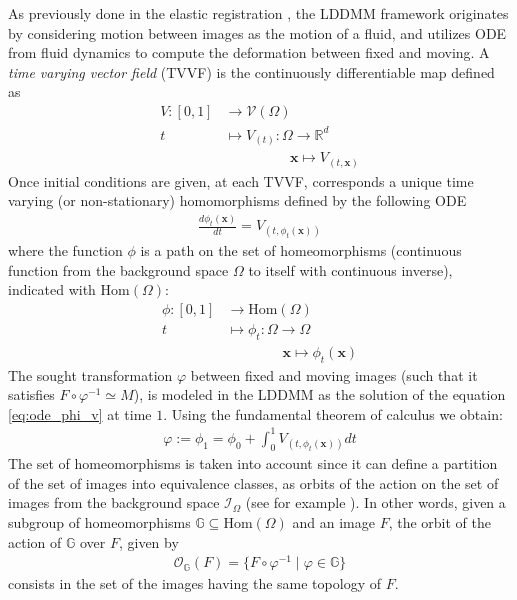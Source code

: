 As previously done in the elastic registration \cite{Broit:1981}, the LDDMM framework \cite{beg2005computing} originates by considering motion between images as the motion of a fluid, and utilizes ODE from fluid dynamics to compute the deformation between fixed and moving. 
 A \emph{time varying vector field} (TVVF) is the continuously differentiable map defined as
 \begin{align*}
 	V:[0,1] & \longrightarrow  \mathcal{V}(\Omega)\\
 	t  &\longmapsto  V_{(t)}  : \Omega \longrightarrow   \mathbb{R}^{d} \\
 	& \qquad \quad \quad ~~~\mathbf{x} \longmapsto V_{(t,\mathbf{x} )}
 \end{align*}
 Once initial conditions are given, at each TVVF, corresponds a unique time varying (or non-stationary) homomorphisms defined  by the following ODE 
 \begin{align}\label{eq:ode_phi_v}
 	\frac{d\phi_{t} (\mathbf{x})}{dt} = V_{(t,\phi_{t} (\mathbf{x}) )}
 \end{align}
 where the function $\phi$ is a path on the set of homeomorphisms  (continuous function from the background space $\Omega$ to itself with continuous inverse), indicated with $\text{Hom}(\Omega)$:
 \begin{align*}
 	\phi : [0,1] & \longrightarrow  \text{Hom}(\Omega)\\
 	t  &\longmapsto \phi_{t}  : \Omega \longrightarrow    \Omega \\
 	& \qquad \quad \quad  \mathbf{x} \longmapsto \phi_{t}  (\mathbf{x} )
 \end{align*}
The sought transformation $\varphi$ between fixed and moving images (such that it satisfies $ F\circ \varphi^{-1} \simeq M $), is modeled in the LDDMM as the solution of the equation \ref{eq:ode_phi_v} at time $1$. Using the fundamental theorem of calculus we obtain:
 \begin{align*}
 	\varphi := \phi_{1} = \phi_{0} + \int_0^1 V_{(t,\phi_{t} (\mathbf{x}) )} dt
 \end{align*}
The set of homeomorphisms is taken into account since it can define a partition of the set of images into equivalence classes, as orbits of the action on the set of images from the background space $\mathcal{I}_{\Omega}$ (see for example \cite{artin2011algebra}). In other words, given a subgroup of homeomorphisms $\mathbb{G}\subseteq \text{Hom}(\Omega)$ and an image $F$, the orbit of the action of $\mathbb{G}$ over $F$, given by
\begin{align*}
\mathcal{O}_{\mathbb{G}}(F) = \{ F\circ \varphi^{-1} \mid \varphi \in \mathbb{G} \}
\end{align*}
consists in the set of the images having the same topology of $F$.\\

